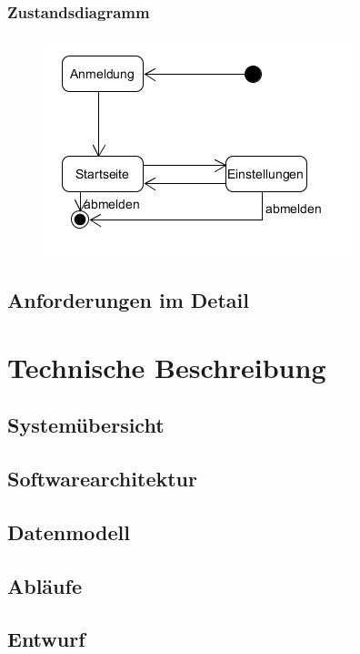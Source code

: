 		\subsubsection{Zustandsdiagramm}
			\begin{figure}[H]
				\includegraphics[scale=1]{images/zustand}
			\end{figure}
	
	\subsection{Anforderungen im Detail}

	
\section{Technische Beschreibung}
	
	\subsection{Systemübersicht}
	
	\subsection{Softwarearchitektur}
	
	\subsection{Datenmodell}
	
	\subsection{Abläufe}
	
	\subsection{Entwurf}
	

